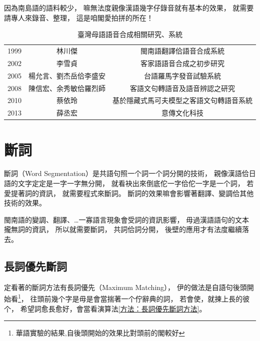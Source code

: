 因為南島語的語料較少，
嘛無法度親像漢語幾字仔錄音就有基本的效果，
就需要請專人來錄音、整理，
這是咱閣愛拍拼的所在！

\begin{table}
\caption{臺灣母語語音合成相關研究、系統}
\label{表：語音合成研究、系統}
\centering
\begin{tabular}{ccc}
1999 & 林川傑 & 閩南語翻譯佮語音合成系統\cite{中文到閩南語之線上翻譯及閩南語之語音合成} \\
2002 & 李雪貞 & 客家語語音合成之初步研究\cite{李雪貞2002客家語語音合成之初步研究} \\
2005 & 楊允言、劉杰岳佮李盛安 & 台語羅馬字發音試驗系統\cite{楊允言_台語羅馬字發音試驗系統} \\
2008 & 陳信宏、余秀敏佮羅烈師 & 客語文句轉語音及語音辨認之研究\cite{陳信宏2008客語文句轉語音及語音辨認之研究} \\
2010 & 蔡依玲 & 基於隱藏式馬可夫模型之客語文句轉語音系統\cite{蔡依玲2010基於隱藏式馬可夫模型之客語文句轉語音系統} \\
2013 & 薛丞宏 & 意傳文化科技\cite{意傳文化科技}
\end{tabular}
\end{table}

\section{斷詞}
\label{節：斷詞}
斷詞（Word Segmentation）是共語句照一个詞一个詞分開的技術，
親像漢語佮日語的文字定定是一字一字無分開，
就看袂出來倒底佗一字佮佗一字是一个詞，
若愛提著詞的資訊，
就需要程式來斷詞。
斷詞的效果嘛會影響著翻譯、變調佮其他技術的效果。

閩南語的變調、翻譯、…一寡語言現象會受詞的資訊影響，
毋過漢語語句的文本攏無詞的資訊，
所以就需要斷詞，
共詞佮詞分開，
後壁的應用才有法度繼續落去。




\subsection{長詞優先斷詞}
\label{節：長詞優先斷詞}

定看著的斷詞方法有長詞優先（Maximum Matching），
伊的做法是自語句後頭開始看\footnote{華語實驗的結果,自後頭開始的效果比對頭前的閣較好}，
往頭前幾个字是毋是會當揣著一个佇辭典的詞，
若會使，就揀上長的彼个，
希望詞愈長愈好，會當看演算法\ref{方法：長詞優先斷詞方法}。

